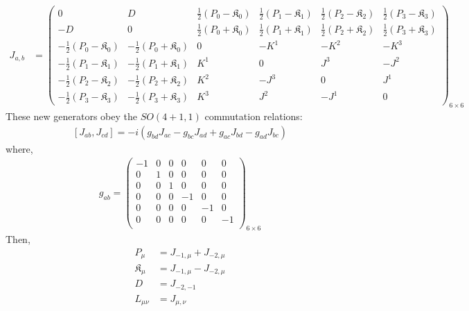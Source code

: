 \documentclass[]{article}
\numberwithin{equation}{section}
\begin{document}
{{\begin{align}
  J_{a,b}&=
  \begin{pmatrix}
  0&D&\frac{1}{2}(P_{0}-\mathfrak{K}_{0})&\frac{1}{2}(P_{1}-\mathfrak{K}_{1})&\frac{1}{2}(P_{2}-\mathfrak{K}_{2})&\frac{1}{2}(P_{3}-\mathfrak{K}_{3})\\
  -D&0&\frac{1}{2}(P_{0}+\mathfrak{K}_{0})&\frac{1}{2}(P_{1}+\mathfrak{K}_{1})&\frac{1}{2}(P_{2}+\mathfrak{K}_{2})&\frac{1}{2}(P_{3}+\mathfrak{K}_{3})\\
    -\frac{1}{2}(P_{0}-\mathfrak{K}_{0})&-\frac{1}{2}(P_{0}+\mathfrak{K}_{0})&0 & -K^{1} & -K^{2} & -K^{3}\\
    -\frac{1}{2}(P_{1}-\mathfrak{K}_{1})&-\frac{1}{2}(P_{1}+\mathfrak{K}_{1})&K^{1} & 0 & J^{3} & -J^{2}\\
    -\frac{1}{2}(P_{2}-\mathfrak{K}_{2})&-\frac{1}{2}(P_{2}+\mathfrak{K}_{2})&K^{2} & -J^{3} & 0 & J^{1}\\
    -\frac{1}{2}(P_{3}-\mathfrak{K}_{3})&-\frac{1}{2}(P_{3}+\mathfrak{K}_{3})&K^{3} & J^{2} & -J^{1} & 0
  \end{pmatrix}_{6\times6}
\end{align}
These new generators obey the $SO(4+1,1)$ commutation relations:
  \begin{align}
      \boxed{\left[J_{{a}{b}},J_{{c}{d}}\right]=-i\left(g_{{b}{d}}J_{{a}{c}}-g_{{b}{c}}J_{{a}{d}}+g_{{a}{c}}J_{{b}{d}}-g_{{a}{d}}J_{{b}{c}}\right)}
  \end{align}
where, 
  \begin{align}
      g_{ab}=\begin{pmatrix}
  -1&0&0&0&0&0\\
  0&1&0&0&0&0\\
  0&0&1&0&0&0\\
  0&0&0&-1&0&0\\
  0&0&0&0&-1&0\\
  0&0&0&0&0&-1\\
  \end{pmatrix}_{6\times6}
  \end{align}
Then,
 \begin{align}
     P_\mu&=J_{-1,\mu}+J_{-2,\mu}\\
     \mathfrak{K}_\mu&=J_{-1,\mu}-J_{-2,\mu}\\
     D&=J_{-2,-1}\\
     L_{\mu\nu}&=J_{\mu,\nu}
 \end{align}
 


}}
\end{document}
